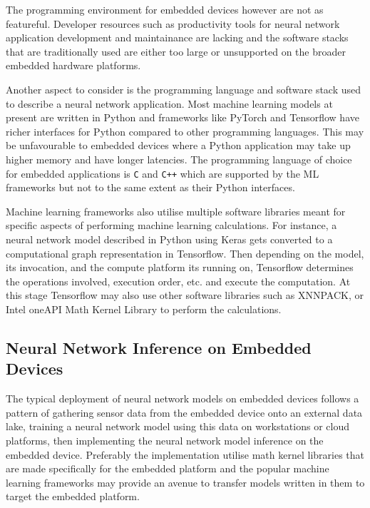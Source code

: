 
The programming environment for embedded devices however are not as featureful. Developer resources such as productivity tools for neural network application development and maintainance are lacking and the software stacks that are traditionally used are either too large or unsupported on the broader embedded hardware platforms.

Another aspect to consider is the programming language and software stack used to describe a neural network application. Most machine learning models at present are written in Python and frameworks like PyTorch and Tensorflow have richer interfaces for Python compared to other programming languages. This may be unfavourable to embedded devices where a Python application may take up higher memory and have longer latencies. The programming language of choice for embedded applications is \texttt{C} and \texttt{C++} which are supported by the ML frameworks but not to the same extent as their Python interfaces.

Machine learning frameworks also utilise multiple software libraries meant for specific aspects of performing machine learning calculations. For instance, a neural network model described in Python using Keras gets converted to a computational graph representation in Tensorflow. Then depending on the model, its invocation, and the compute platform its running on, Tensorflow determines the operations involved, execution order, etc. and execute the computation. At this stage Tensorflow may also use other software libraries such as XNNPACK, or Intel oneAPI Math Kernel Library to perform the calculations.

\subsection{Neural Network Inference on Embedded Devices}

The typical deployment of neural network models on embedded devices follows a pattern of gathering sensor data from the embedded device onto an external data lake, training a neural network model using this data on workstations or cloud platforms, then implementing the neural network model inference on the embedded device. Preferably the implementation utilise math kernel libraries that are made specifically for the embedded platform and the popular machine learning frameworks may provide an avenue to transfer models written in them to target the embedded platform.

